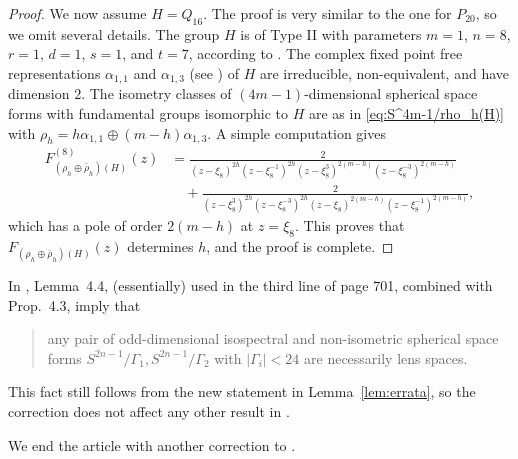 \documentclass[12pt,a4paper,final]{amsart}
\theoremstyle{plain}
\theoremstyle{definition}
\theoremstyle{remark}
\numberwithin{equation}{section}
\begin{document}
\begin{proof}
We now assume $H=Q_{16}$. 
The proof is very similar to the one for $P_{20}$, so we omit several details. 
The group $H$ is of Type II with parameters $m=1$, $n=8$, $r=1$, $d=1$, $s=1$, and $t=7$, according to \cite{Wolf01}. 
The complex fixed point free representations $\alpha_{1,1}$ and $\alpha_{1,3}$ (see \cite[(4.2)]{Wolf01}) of $H$ are irreducible, non-equivalent, and have dimension $2$.
The isometry classes of $(4m-1)$-dimensional spherical space forms with fundamental groups isomorphic to $H$ are as in \eqref{eq:S^4m-1/rho_h(H)} with $\rho_h=h\alpha_{1,1}\oplus(m-h)\alpha_{1,3}$. 
A simple computation gives 
\begin{equation}
\begin{aligned}
F_{(\rho_h\oplus\bar\rho_h)(H)}^{(8)}(z)&
= \frac{2}{ 
	(z-\xi_{8})^{2h} 
	(z-\xi_{8}^{-1})^{2h} 
	(z-\xi_{8}^3)^{2(m-h)}
	(z-\xi_{8}^{-3})^{2(m-h)}
}
\\&\quad 
+
\frac{2}{ 
	(z-\xi_{8}^{3})^{2h} 
	(z-\xi_{8}^{-3})^{2h} 
	(z-\xi_{8})^{2(m-h)}
	(z-\xi_{8}^{-1})^{2(m-h)}
}
,
\end{aligned}
\end{equation}
which has a pole of order $2(m-h)$ at $z=\xi_8$. 
This proves that $F_{(\rho_h\oplus\bar\rho_h)(H)}(z)$ determines $h$, and the proof is complete. 
\end{proof}

In \cite{LauretLinowitz}, Lemma~4.4, (essentially) used in the third line of page 701, combined with Prop.~4.3, imply that 
\begin{quote}
any pair of odd-dimensional isospectral and non-isometric spherical space forms $S^{2n-1}/\Gamma_1,S^{2n-1}/\Gamma_2$ with $|\Gamma_i|<24$ are necessarily lens spaces.
\end{quote}
This fact still follows from the new statement in Lemma~\ref{lem:errata}, so the correction does not affect any other result in \cite{LauretLinowitz}. 



We end the article with another correction to \cite{LauretLinowitz}. 
\end{document}
